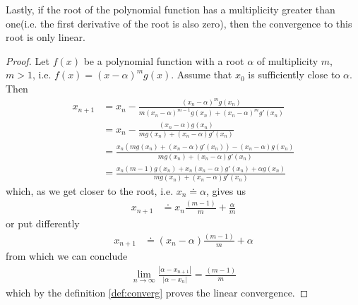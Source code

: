 \documentclass[
  digital, %
  table,   %
  nolof,     %
  nolot,     %
	draft, %
]{fithesis3}
\begin{document}
Lastly, if the root of the polynomial function has a multiplicity greater than one(i.e. the first derivative of the root is also zero), then the convergence to this root is only linear.
\begin{proof}
Let $f(x)$ be a polynomial function with a root $\alpha$ of multiplicity $m$, $m > 1$, i.e. $f(x) = (x-\alpha)^{m}g(x)$. Assume that $x_{0}$ is sufficiently close to $\alpha$. Then
\begin{align}
x_{n+1} &= x_{n} - \frac{(x_{n} - \alpha)^{m}g(x_{n})}{m(x_{n}-\alpha)^{m-1}g(x_{n}) + (x_{n}-\alpha)^{m}g'(x_{n})} \\
&= x_{n} - \frac{(x_{n} - \alpha)g(x_{n})}{mg(x_{n}) + (x_{n}-\alpha)g'(x_{n})} \\
&= \frac{x_{n}(mg(x_{n}) + (x_{n}-\alpha)g'(x_{n})) - (x_{n} - \alpha)g(x_{n})}{mg(x_{n}) + (x_{n}-\alpha)g'(x_{n})} \\
&= \frac{x_{n}(m - 1)g(x_{n}) + x_{n}(x_{n}-\alpha)g'(x_{n}) + {\alpha}g(x_{n})}{mg(x_{n}) + (x_{n}-\alpha)g'(x_{n})}
\end{align}
which, as we get closer to the root, i.e. $x_{n} \doteq \alpha$, gives us
\begin{align}
x_{n+1} &\doteq x_{n}\frac{(m - 1)}{m}+\frac{\alpha}{m}
\end{align}
or put differently
\begin{align}
x_{n+1} &\doteq (x_{n}-\alpha)\frac{(m - 1)}{m}+\alpha
\end{align}
from which we can conclude
\begin{align}
\lim_{n\to\infty}\frac{\left|\alpha - x_{n+1}\right|}{\left|\alpha-x_{n}\right|} = \frac{(m - 1)}{m}
\end{align}
which by the definition \ref{def:converg} proves the linear convergence.
\end{proof}
\end{document}
